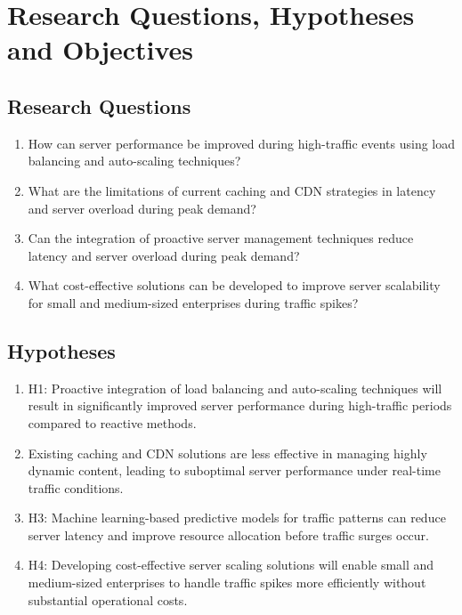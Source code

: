 \documentclass[a4paper, 12pt]{article}
\begin{document}
\section{Research Questions, Hypotheses and Objectives}
\subsection{Research Questions}
\begin{enumerate}
    \item How can server performance be improved during high-traffic events using load balancing and auto-scaling techniques?
    \item What are the limitations of current caching and CDN strategies in latency and server overload during peak demand?
    \item Can the integration of proactive server management techniques reduce latency and server overload during peak demand?
    \item What cost-effective solutions can be developed to improve server scalability for small and medium-sized enterprises during traffic spikes?
\end{enumerate}
\subsection{Hypotheses}
\begin{enumerate}
    \item H1: Proactive integration of load balancing and auto-scaling techniques will result in significantly improved server performance during high-traffic periods compared to reactive methods.
    \item  Existing caching and CDN solutions are less effective in managing highly dynamic content, leading to suboptimal server performance under real-time traffic conditions.
    \item H3: Machine learning-based predictive models for traffic patterns can reduce server latency and improve resource allocation before traffic surges occur.
    \item H4: Developing cost-effective server scaling solutions will enable small and medium-sized enterprises to handle traffic spikes more efficiently without substantial operational costs.
\end{enumerate}
\end{document}
